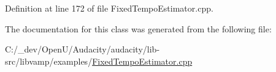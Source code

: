 Definition at line 172 of file Fixed\+Tempo\+Estimator.\+cpp.



The documentation for this class was generated from the following file\+:\begin{DoxyCompactItemize}
\item 
C\+:/\+\_\+dev/\+Open\+U/\+Audacity/audacity/lib-\/src/libvamp/examples/\hyperlink{_fixed_tempo_estimator_8cpp}{Fixed\+Tempo\+Estimator.\+cpp}\end{DoxyCompactItemize}

